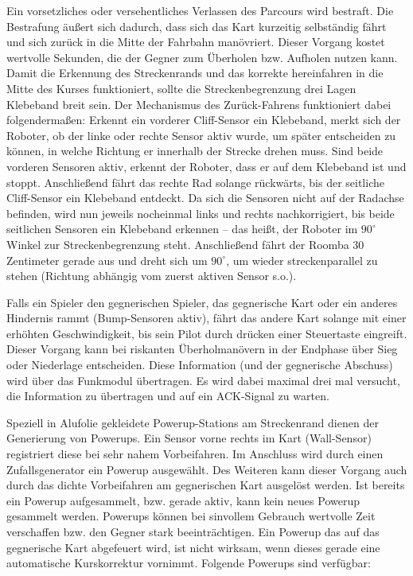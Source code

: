Ein vorsetzliches oder versehentliches Verlassen des Parcours wird bestraft. Die Bestrafung äußert sich dadurch, dass sich das Kart kurzeitig selbständig fährt und sich zurück in die Mitte der Fahrbahn manövriert. Dieser Vorgang kostet wertvolle Sekunden, die der Gegner zum Überholen bzw. Aufholen nutzen kann. Damit die Erkennung des Streckenrands und das korrekte hereinfahren in die Mitte des Kurses funktioniert, sollte die Streckenbegrenzung drei Lagen Klebeband breit sein. Der Mechanismus des Zurück-Fahrens funktioniert dabei folgendermaßen: Erkennt ein vorderer Cliff-Sensor ein Klebeband, merkt sich der Roboter, ob der linke oder rechte Sensor aktiv wurde, um später entscheiden zu können, in welche Richtung er innerhalb der Strecke drehen muss. Sind beide vorderen Sensoren aktiv, erkennt der Roboter, dass er auf dem Klebeband ist und stoppt. Anschließend fährt das rechte Rad solange rückwärts, bis der seitliche Cliff-Sensor ein Klebeband entdeckt. Da sich die Sensoren nicht auf der Radachse befinden, wird nun jeweils nocheinmal links und rechts nachkorrigiert, bis beide seitlichen Sensoren ein Klebeband erkennen – das heißt, der Roboter im $90^\circ$ Winkel zur Streckenbegrenzung steht. Anschließend fährt der Roomba 30 Zentimeter gerade aus und dreht sich um $90^\circ$, um wieder streckenparallel zu stehen (Richtung abhängig vom zuerst aktiven Sensor s.o.).

Falls ein Spieler den gegnerischen Spieler, das gegnerische Kart oder ein anderes Hindernis rammt (Bump-Sensoren aktiv), fährt das andere Kart solange mit einer erhöhten Geschwindigkeit, bis sein Pilot durch drücken einer Steuertaste eingreift. Dieser Vorgang kann bei riskanten Überholmanövern in der Endphase über Sieg oder Niederlage entscheiden. Diese Information (und der gegnerische Abschuss) wird über das Funkmodul übertragen. Es wird dabei maximal drei mal versucht, die Information zu übertragen und auf ein ACK-Signal zu warten. 

Speziell in Alufolie gekleidete Powerup-Stations am Streckenrand dienen der Generierung von Powerups. Ein Sensor vorne rechts im Kart (Wall-Sensor) registriert diese bei sehr nahem Vorbeifahren. Im Anschluss wird durch einen Zufallsgenerator ein Powerup ausgewählt. Des Weiteren kann dieser Vorgang auch durch das dichte Vorbeifahren am gegnerischen Kart ausgelöst werden. Ist bereits ein Powerup aufgesammelt, bzw. gerade aktiv, kann kein neues Powerup gesammelt werden. Powerups können bei sinvollem Gebrauch wertvolle Zeit verschaffen bzw. den Gegner stark beeinträchtigen. Ein Powerup das auf das gegnerische Kart abgefeuert wird, ist nicht wirksam, wenn dieses gerade eine automatische Kurskorrektur vornimmt. Folgende Powerups sind verfügbar: 

